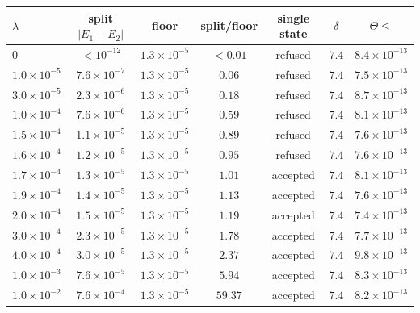 \footnotesize
\setlength{\tabcolsep}{2pt}
\begin{tabular}{lcccccc}
\toprule
$\lambda$ & split $|E_1-E_2|$ & floor & split/floor & single state & $\delta$ & $\Theta\le$ \\
\midrule
$0$ & $<10^{-12}$ & $1.3\times10^{-5}$ & $<0.01$ & refused & $7.4$ & $8.4\times10^{-13}$ \\
$1.0\times10^{-5}$ & $7.6\times10^{-7}$ & $1.3\times10^{-5}$ & $0.06$ & refused & $7.4$ & $7.5\times10^{-13}$ \\
$3.0\times10^{-5}$ & $2.3\times10^{-6}$ & $1.3\times10^{-5}$ & $0.18$ & refused & $7.4$ & $8.7\times10^{-13}$ \\
$1.0\times10^{-4}$ & $7.6\times10^{-6}$ & $1.3\times10^{-5}$ & $0.59$ & refused & $7.4$ & $8.1\times10^{-13}$ \\
$1.5\times10^{-4}$ & $1.1\times10^{-5}$ & $1.3\times10^{-5}$ & $0.89$ & refused & $7.4$ & $7.6\times10^{-13}$ \\
$1.6\times10^{-4}$ & $1.2\times10^{-5}$ & $1.3\times10^{-5}$ & $0.95$ & refused & $7.4$ & $7.6\times10^{-13}$ \\
$1.7\times10^{-4}$ & $1.3\times10^{-5}$ & $1.3\times10^{-5}$ & $1.01$ & accepted & $7.4$ & $8.1\times10^{-13}$ \\
$1.9\times10^{-4}$ & $1.4\times10^{-5}$ & $1.3\times10^{-5}$ & $1.13$ & accepted & $7.4$ & $7.6\times10^{-13}$ \\
$2.0\times10^{-4}$ & $1.5\times10^{-5}$ & $1.3\times10^{-5}$ & $1.19$ & accepted & $7.4$ & $7.4\times10^{-13}$ \\
$3.0\times10^{-4}$ & $2.3\times10^{-5}$ & $1.3\times10^{-5}$ & $1.78$ & accepted & $7.4$ & $7.7\times10^{-13}$ \\
$4.0\times10^{-4}$ & $3.0\times10^{-5}$ & $1.3\times10^{-5}$ & $2.37$ & accepted & $7.4$ & $9.8\times10^{-13}$ \\
$1.0\times10^{-3}$ & $7.6\times10^{-5}$ & $1.3\times10^{-5}$ & $5.94$ & accepted & $7.4$ & $8.3\times10^{-13}$ \\
$1.0\times10^{-2}$ & $7.6\times10^{-4}$ & $1.3\times10^{-5}$ & $59.37$ & accepted & $7.4$ & $8.2\times10^{-13}$ \\
\bottomrule
\end{tabular}
